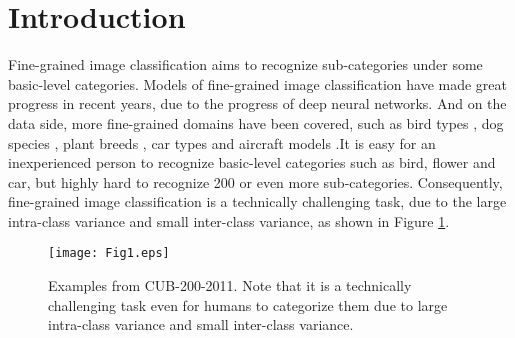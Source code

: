 \documentclass[10pt,twocolumn,letterpaper]{article}
\begin{document}
\section{Introduction}
Fine-grained image classification  aims to recognize sub-categories under some basic-level categories. Models of fine-grained image classification have made great progress in recent years\cite{partstacked,twoattention,partrcnn,spatialconstraints,picking}, due to the progress of deep neural networks. And on the data side, more fine-grained domains have been covered, such as bird types \cite{birdsnap,cub2011}, dog species \cite{stanforddog}, plant breeds \cite{plant} , car types \cite{krause20133d} and aircraft models \cite{aricraft}.It is easy for an inexperienced person to recognize basic-level categories such as bird, flower and car, but highly hard to recognize 200 or even more sub-categories. Consequently, fine-grained image classification is a technically challenging task, due to the large intra-class variance and small inter-class variance, as shown in Figure \ref{example}.

\begin{figure}[t]
\begin{center}
\texttt{[image: Fig1.eps]}
\end{center}
   \caption{Examples from CUB-200-2011. Note that it is a technically challenging task even for humans to categorize them due to large intra-class variance and small inter-class variance.}
\label{example}
\end{figure}
\end{document}
